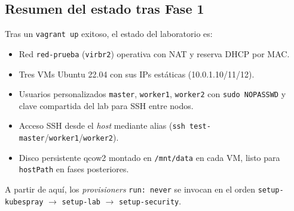 \subsection{Resumen del estado tras Fase 1}

Tras un \texttt{vagrant up} exitoso, el estado del laboratorio es:

\begin{itemize}
  \item Red \texttt{red-prueba} (\texttt{virbr2}) operativa con NAT y reserva DHCP por MAC.
  \item Tres VMs Ubuntu 22.04 con sus IPs estáticas (10.0.1.10/11/12).
  \item Usuarios personalizados \texttt{master}, \texttt{worker1}, \texttt{worker2} con \texttt{sudo NOPASSWD} y clave compartida del lab para SSH entre nodos.
  \item Acceso SSH desde el \emph{host} mediante alias (\texttt{ssh test-master}/\texttt{worker1}/\texttt{worker2}).
  \item Disco persistente qcow2 montado en \texttt{/mnt/data} en cada VM, listo para \texttt{hostPath} en fases posteriores.
\end{itemize}

A partir de aquí, los \emph{provisioners} \texttt{run: never} se invocan en el orden \texttt{setup-kubespray} $\to$ \texttt{setup-lab} $\to$ \texttt{setup-security}.
